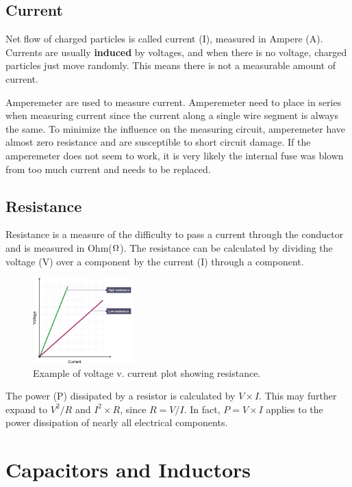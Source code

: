 \documentclass{article}
\begin{document}
\subsection{Current}

Net flow of charged particles is called current (I), measured in Ampere (A). Currents are usually \textbf{induced} by voltages, and when there is no voltage, charged particles just move randomly. This means there is not a measurable amount of current. \par
Amperemeter are used to measure current. Amperemeter need to place in series when measuring current since the current along a single wire segment is always the same. To minimize the influence on the measuring circuit, amperemeter have almost zero resistance and are susceptible to short circuit damage. If the amperemeter does not seem to work, it is very likely the internal fuse was blown from too much current and needs to be replaced.

\subsection{Resistance}

Resistance is a measure of the difficulty to pass a current through the conductor and is measured in Ohm($\ohm$). The resistance can be calculated by dividing the voltage (V) over a component by the current (I) through a component. \par

\begin{figure}[!h]
	\center
	\includegraphics[width=0.35\textwidth, keepaspectratio]{rvi}
	\caption{Example of voltage v. current plot showing resistance.}
	\label{fig:rvi}
\end{figure}

The power (P) dissipated by a resistor is calculated by $V\times I$. This may further expand to $V^2/R$ and $I^2\times R$, since $R=V/I$. In fact, $P=V\times I$ applies to the power dissipation of nearly all electrical components.

\section{Capacitors and Inductors}
\end{document}
